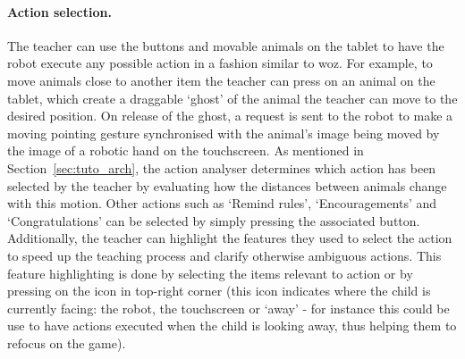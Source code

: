 \paragraph{Action selection.} The teacher can use the buttons and movable animals on the tablet to have the robot execute any possible action in a fashion similar to \gls{woz}. For example, to move animals close to another item the teacher can press on an animal on the tablet, which create a draggable `ghost' of the animal the teacher can move to the desired position. On release of the ghost, a request is sent to the robot to make a moving pointing gesture synchronised with the animal's image being moved by the image of a robotic hand on the touchscreen.
As mentioned in Section~\ref{sec:tuto_arch}, the action analyser determines which action has been selected by the teacher by evaluating how the distances between animals change with this motion. Other actions such as `Remind rules', `Encouragements' and  `Congratulations' can be selected by simply pressing the associated button.
Additionally, the teacher can highlight the features they used to select the action to speed up the teaching process and clarify otherwise ambiguous actions. This feature highlighting is done by selecting the items relevant to action or by pressing on the icon in top-right corner (this icon indicates where the child is currently facing: the robot, the touchscreen or `away' - for instance this could be use to have actions executed when the child is looking away, thus helping them to refocus on the game).
